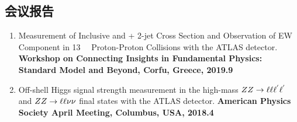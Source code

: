 \begin{publications}
\section*{会议报告}
\begin{enumerate}
    \item Measurement of Inclusive \llll and \llvv + 2-jet Cross Section and Observation of EW Component in 13~\TeV~ Proton-Proton Collisions with the ATLAS detector. \textbf{Workshop on Connecting Insights in Fundamental Physics: Standard Model and Beyond, Corfu, Greece, 2019.9}
    \item Off-shell Higgs signal strength measurement in the high-mass $ZZ \rightarrow \ell\ell\ell^{'}\ell^{'}$ and $ZZ \rightarrow \ell\ell\nu\nu$ final states with the ATLAS detector. \textbf{American Physics Society April Meeting, Columbus, USA, 2018.4}
\end{enumerate}

\end{publications}
